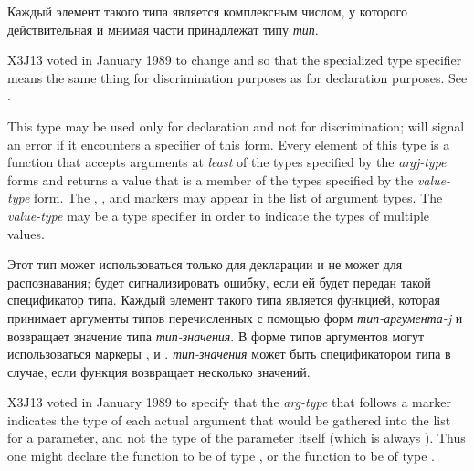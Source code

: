 \begin{flushdesc}
\item[\cd{(copmlex \emph{тип})}]
Каждый элемент такого типа является комплексным числом, у которого
действительная и мнимая части принадлежат типу \emph{тип}.

\begin{new}
X3J13 voted in January 1989
to change  and 
so that the specialized 
type specifier means the same thing for discrimination purposes
as for declaration purposes.
See .
\end{new}


\item[\cd{(function (\emph{arg1-type} \emph{arg2-type} ...) \emph{value-type})}]
\relax This type may be used only for declaration and not for
discrimination;  will signal an error if it encounters a specifier of
this form. Every element of this type is
a function that accepts arguments at \emph{least} of the
types specified by the \emph{argj-type} forms and returns a value that is a
member of the types specified by the \emph{value-type} form.  The
, , and  markers
may appear in the list of argument types.
The \emph{value-type} may be a  type specifier
in order to indicate the types of multiple values.

\item[\cd{(function (\emph{тип-аргумента-1} \emph{тип-аргумента-2} ...) \emph{тип-значения})}]
\relax Этот тип может использоваться только для декларации и не может для
распознавания;  будет сигнализировать ошибку, если ей будет передан
такой спецификатор типа. Каждый элемент такого типа является функцией, которая
принимает аргументы типов перечисленных с помощью форм \emph{тип-аргумента-j}
и возвращает значение типа \emph{тип-значения}. В форме типов аргументов могут
использоваться маркеры ,  и
. \emph{тип-значения} может быть спецификатором типа  в
случае, если функция возвращает несколько значений.

\begin{new}
X3J13 voted in January 1989
to specify that the \emph{arg-type} that
follows a  marker indicates the type of each actual argument
that would be gathered into the list for a  parameter,
and not the type of the  parameter itself (which is always
).  Thus one might declare the function  to
be of type , or
the function  to be of type
.
\end{new}


\end{flushdesc}
